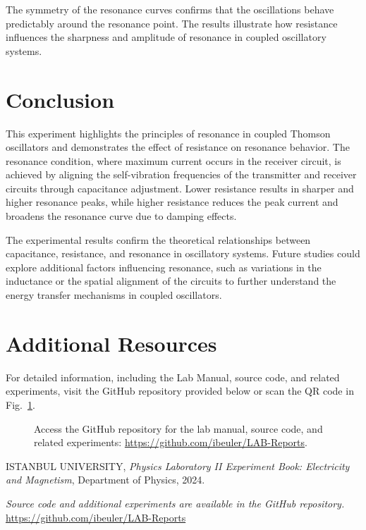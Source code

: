 \documentclass[journal]{IEEEtran}
\begin{document}
The symmetry of the resonance curves confirms that the oscillations behave predictably around the resonance point. The results illustrate how resistance influences the sharpness and amplitude of resonance in coupled oscillatory systems.

\section{Conclusion}
This experiment highlights the principles of resonance in coupled Thomson oscillators and demonstrates the effect of resistance on resonance behavior. The resonance condition, where maximum current occurs in the receiver circuit, is achieved by aligning the self-vibration frequencies of the transmitter and receiver circuits through capacitance adjustment. Lower resistance results in sharper and higher resonance peaks, while higher resistance reduces the peak current and broadens the resonance curve due to damping effects.

The experimental results confirm the theoretical relationships between capacitance, resistance, and resonance in oscillatory systems. Future studies could explore additional factors influencing resonance, such as variations in the inductance or the spatial alignment of the circuits to further understand the energy transfer mechanisms in coupled oscillators.

\section{Additional Resources}
For detailed information, including the Lab Manual, source code, and related experiments, visit the GitHub repository provided below or scan the QR code in Fig.~\ref{fig:qr_code}.

\begin{figure}[H]
    
    \centering
    \begin{minipage}{0.15\textwidth}
        \centering
    \end{minipage}%
    \begin{minipage}{0.2\textwidth}
        \raggedright
        \caption{Access the GitHub repository for the lab manual, source code, and related experiments: \href{https://github.com/ibeuler/LAB-Reports}{\url{https://github.com/ibeuler/LAB-Reports}}.}
        \label{fig:qr_code}
    \end{minipage}
\end{figure}

\begin{thebibliography}{9}
    ISTANBUL UNIVERSITY, \textit{Physics Laboratory II Experiment Book: Electricity and Magnetism}, Department of Physics, 2024.

    \textit{Source code and additional experiments are available in the GitHub repository.} \url{https://github.com/ibeuler/LAB-Reports}
\end{thebibliography}
\end{document}
